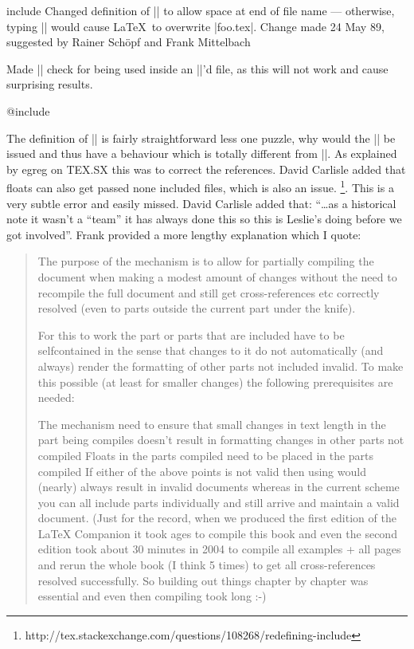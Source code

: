 \begin{multicols}
\begin{docCommand}{include}{}
 Changed definition of || to allow space at end of file name
 --- otherwise, typing || would cause \LaTeX\ to
 overwrite |foo.tex|.  Change made 24 May 89, suggested by Rainer
 Sch\"opf  and Frank Mittelbach

 Made || check for being used inside an ||'d file, as
 this will not work and cause surprising results.
\end{docCommand}
%
 \begin{docCommand}{@include}{}
 
 The definition of |\@include| is fairly
 straightforward less one puzzle, why would the |\clearpage| be
 issued and thus have a behaviour which is totally different from
 ||. As explained by egreg on TEX.SX this was to correct the references.
 David Carlisle added that floats can also get passed none included
 files, which is also an issue.
 \footnote{http://tex.stackexchange.com/questions/108268/redefining-include}. This is a very subtle error and easily missed. David Carlisle added that: ``\ldots as a historical note it wasn't a \enquote{team} it has always done this so this is Leslie's doing before we got involved''.
Frank provided a more lengthy explanation which I quote:
\begin{quotation}
The purpose of the  mechanism is to allow for partially compiling the document when making a modest amount of changes without the need to recompile the full document and still get cross-references etc correctly resolved (even to parts outside the current part under the knife).

For this to work the part or parts that are included have to be selfcontained in the sense that changes to it do not automatically (and always) render the formatting of other parts not included invalid. To make this possible (at least for smaller changes) the following prerequisites are needed:

The mechanism need to ensure that small changes in text length in the part being compiles doesn't result in formatting changes in other parts not compiled
Floats in the parts compiled need to be placed in the parts compiled
If either of the above points is not valid then using  would (nearly) always result in invalid documents whereas in the current scheme you can all include parts individually and still arrive and maintain a valid document. (Just for the record, when we produced the first edition of the LaTeX Companion it took ages to compile this book and even the second edition took about 30 minutes in 2004 to compile all examples + all pages and rerun the whole book (I think 5 times) to get all cross-references resolved successfully. So building out things chapter by chapter was essential and even then compiling took long :-)


\end{quotation}
\end{docCommand}
\end{multicols}
